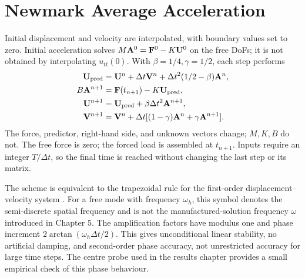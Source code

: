 \section{Newmark Average Acceleration}
Initial displacement and velocity are interpolated, with boundary values
set to zero. Initial acceleration solves \(M\mathbf{A}^0=\mathbf{F}^0-K\mathbf{U}^0\)
on the free DoFs; it is not obtained by interpolating \(u_{tt}(0)\).
With \(\beta=1/4,\gamma=1/2\), each step performs
\begin{align*}
 \mathbf{U}_{\rm pred}&=\mathbf{U}^n+\Delta t\mathbf{V}^n+
                  \Delta t^2(1/2-\beta)\mathbf{A}^n,\\
 B\mathbf{A}^{n+1}&=\mathbf{F}(t_{n+1})-K\mathbf{U}_{\rm pred},\\
 \mathbf{U}^{n+1}&=\mathbf{U}_{\rm pred}+\beta\Delta t^2\mathbf{A}^{n+1},\\
 \mathbf{V}^{n+1}&=\mathbf{V}^n+\Delta t[(1-\gamma)\mathbf{A}^n+\gamma\mathbf{A}^{n+1}].
\end{align*}
The force, predictor, right-hand side, and unknown vectors change; \(M,K,B\)
do not. The free force is zero; the forced load is assembled at \(t_{n+1}\).
Inputs require an integer \(T/\Delta t\), so the final time is reached without
changing the last step or its matrix.

The scheme is equivalent to the trapezoidal rule for the first-order
displacement--velocity system \cite{newmark}. For a free mode with frequency
\(\omega_h\), this symbol denotes the semi-discrete spatial frequency and is
not the manufactured-solution frequency \(\omega\) introduced in Chapter 5.
The amplification factors have modulus one and phase increment
\(2\arctan(\omega_h\Delta t/2)\). This gives unconditional linear stability,
no artificial damping, and second-order phase accuracy, not unrestricted
accuracy for large time steps. The centre probe used in the results chapter
provides a small empirical check of this phase behaviour.
